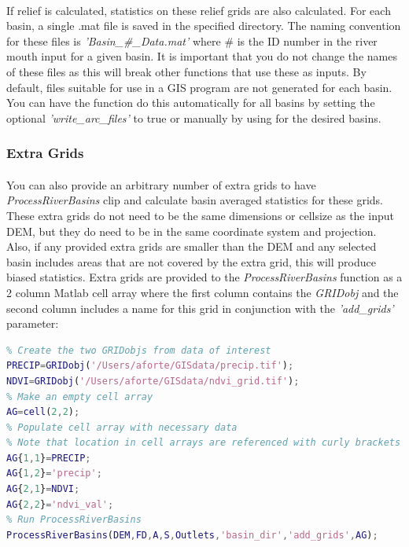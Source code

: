 \paragraph{}If relief is calculated, statistics on these relief grids are also calculated. For each basin, a single .mat file is saved in the specified directory. The naming convention for these files is \textit{'Basin\_\#\_Data.mat'} where \# is the ID number in the river mouth input for a given basin. It is important that you do not change the names of these files as this will break other functions that use these as inputs. By default, files suitable for use in a GIS program are not generated for each basin. You can have the function do this automatically for all basins by setting the optional \textit{'write\_arc\_files'} to true or manually by using  for the desired basins.

\subsubsection{Extra Grids}
\paragraph{}You can also provide an arbitrary number of extra grids to have \textit{ProcessRiverBasins} clip and calculate basin averaged statistics for these grids. These extra grids do not need to be the same dimensions or cellsize as the input DEM, but they do need to be in the same coordinate system and projection. Also, if any provided extra grids are smaller than the DEM and any selected basin includes areas that are not covered by the extra grid, this will produce biased statistics. Extra grids are provided to the \textit{ProcessRiverBasins} function as a 2 column Matlab cell array where the first column contains the \textit{GRIDobj} and the second column includes a name for this grid in conjunction with the \textit{'add\_grids'} parameter:

\begin{lstlisting}[language=Matlab]
% To run ProcessRiverBasins and include two extra grids
% Create the two GRIDobjs from data of interest
PRECIP=GRIDobj('/Users/aforte/GISdata/precip.tif');
NDVI=GRIDobj('/Users/aforte/GISdata/ndvi_grid.tif');
% Make an empty cell array
AG=cell(2,2);
% Populate cell array with necessary data 
% Note that location in cell arrays are referenced with curly brackets
AG{1,1}=PRECIP;
AG{1,2}='precip';
AG{2,1}=NDVI;
AG{2,2}='ndvi_val';
% Run ProcessRiverBasins
ProcessRiverBasins(DEM,FD,A,S,Outlets,'basin_dir','add_grids',AG);
\end{lstlisting}


